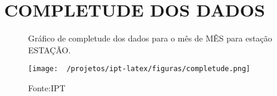 \section{COMPLETUDE DOS DADOS}

\label{fig:completude}
\begin{figure}[htb!]
    \centering
	\captionsetup{justification=raggedright, singlelinecheck=false, width=1\textwidth}
    \caption{Gráfico de completude dos dados para o mês de MÊS para estação ESTAÇÃO.}
    \texttt{[image: ~/projetos/ipt-latex/figuras/completude.png]} %
    \caption*{Fonte:IPT}
\end{figure}

